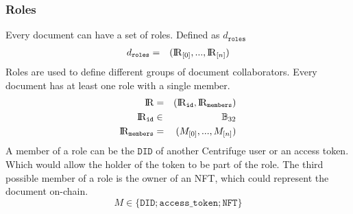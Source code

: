 \subsubsection{Roles}\label{sec:roles_rules}
Every document can have a set of roles. Defined as $d_{\mathtt{roles}}$
\begin{eqnarray}
d_{\mathtt{roles}} & = & ({\rm I\!R}_{[0]}, ..., {\rm I\!R}_{[n]})
\end{eqnarray}
Roles are used to define different groups of document collaborators.
Every document has at least one role with a single member.
\begin{eqnarray}
{\rm I\!R} &= &({\rm I\!R}_\mathtt{id},{\rm I\!R}_{\mathtt{members}}) \\
{\rm I\!R}_{\mathtt{id}} &\in & \mathbb{B}_{32}\\
{\rm I\!R}_{\mathtt{members}}  &=& (M_{[0]},...,M_{[n]})
\end{eqnarray}
A member of a role can be the $\mathtt{DID}$ of another Centrifuge user or an access token. Which would allow the holder of the token to be part of the role. The third possible member of a role is the owner of an NFT, which could represent the document on-chain.
\begin{equation}
M \in  \{\mathtt{DID};\mathtt{access\_token};\mathtt{NFT}\}
\end{equation}



